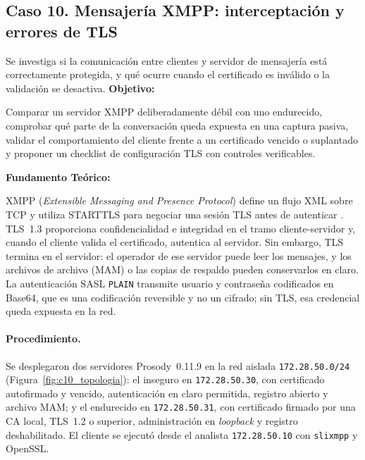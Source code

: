\subsection{Caso 10. Mensajería XMPP: interceptación y errores de TLS}
\label{caso:xmpp-tls}

\begin{situacion}
Se investiga si la comunicación entre clientes y servidor de mensajería está correctamente protegida, y qué ocurre cuando el certificado es inválido o la validación se desactiva.
\textbf{Objetivo:} \par
Comparar un servidor XMPP deliberadamente débil con uno endurecido, comprobar qué parte de la conversación queda expuesta en una captura pasiva, validar el comportamiento del cliente frente a un certificado vencido o suplantado y proponer un checklist de configuración TLS con controles verificables. \par
\textbf{Fundamento Teórico:} \par
XMPP (\textit{Extensible Messaging and Presence Protocol}) define un flujo XML sobre TCP y utiliza STARTTLS para negociar una sesión TLS antes de autenticar \parencite{rfc6120}. TLS~1.3 \parencite{rfc8446} proporciona confidencialidad e integridad en el tramo cliente-servidor y, cuando el cliente valida el certificado, autentica al servidor. Sin embargo, TLS termina en el servidor: el operador de ese servidor puede leer los mensajes, y los archivos de archivo (MAM) o las copias de respaldo pueden conservarlos en claro. La autenticación SASL \texttt{PLAIN} transmite usuario y contraseña codificados en Base64, que es una codificación reversible y no un cifrado; sin TLS, esa credencial queda expuesta en la red.
\end{situacion}

\paragraph{Procedimiento.}
Se desplegaron dos servidores Prosody~0.11.9 en la red aislada \texttt{172.28.50.0/24} (Figura~\ref{fig:c10_topologia}): el inseguro en \texttt{172.28.50.30}, con certificado autofirmado y vencido, autenticación en claro permitida, registro abierto y archivo MAM; y el endurecido en \texttt{172.28.50.31}, con certificado firmado por una CA local, TLS~1.2 o superior, administración en \textit{loopback} y registro deshabilitado. El cliente se ejecutó desde el analista \texttt{172.28.50.10} con \texttt{slixmpp} y OpenSSL.

